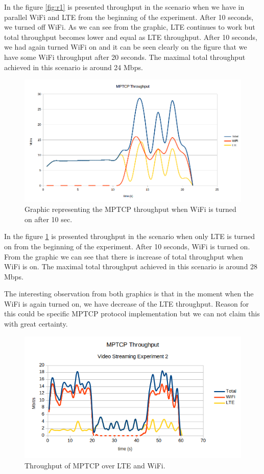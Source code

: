 \documentclass{llncs}
\begin{document}
In the figure \ref{fig:r1} is presented throughput in the scenario when we have in parallel WiFi and LTE from the beginning of the experiment. After 10 seconds, we turned off WiFi. As we can see from the graphic, LTE continues to work but total throughput becomes lower and equal as LTE throughput. After 10 seconds, we had again turned WiFi on and it can be seen clearly on the figure that we have some WiFi throughput after 20 seconds. The maximal total throughput achieved in this scenario is around 24 Mbps.

\begin{figure}
\centering
\includegraphics[width=1.0\textwidth]{result2.png}
\caption{\label{fig:r2} Graphic representing the MPTCP throughput when WiFi is turned on after 10 sec.}
\end{figure}

In the figure \ref{fig:r2} is presented throughput in the scenario when only LTE is turned on from the beginning of the experiment. After 10 seconds, WiFi is turned on. From the graphic we can see that there is increase of total throughput when WiFi is on. The maximal total throughput achieved in this scenario is around 28 Mbps.

The interesting observation from both graphics is that in the moment when the WiFi is again turned on, we have decrease of the LTE throughput. Reason for this could be specific MPTCP protocol implementation but we can not claim this with great certainty.

 
\begin{figure}[H]
\centering
\includegraphics[scale=0.8]{videotest2.png}
\caption{\label{fig:videotest2} Throughput of MPTCP over LTE and WiFi.}
\end{figure} 
 
\end{document}
